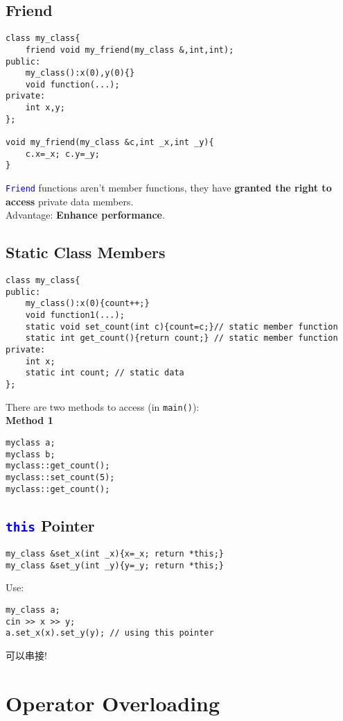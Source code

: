 \documentclass[12pt,a4paper]{article}
\begin{document}
			
		\subsection{Friend}
			\begin{lstlisting}
class my_class{
	friend void my_friend(my_class &,int,int);
public:
	my_class():x(0),y(0){}
	void function(...);
private:
	int x,y;
};

void my_friend(my_class &c,int _x,int _y){
	c.x=_x; c.y=_y;
}
\end{lstlisting}
			\texttt{\textcolor{blue}{Friend}} functions aren't member functions, they have \textbf{granted the right to access} private data members.\\
			Advantage: \textbf{Enhance performance}.
	
		\subsection{Static Class Members}
			\begin{lstlisting}
class my_class{
public:
	my_class():x(0){count++;}
	void function1(...);
	static void set_count(int c){count=c;}// static member function
	static int get_count(){return count;} // static member function
private:
	int x;
	static int count; // static data
};
\end{lstlisting}
			There are two methods to access (in \texttt{main()}):\\
			\textbf{Method 1}
			\begin{lstlisting}
myclass a;
myclass b;
myclass::get_count();
myclass::set_count(5);
myclass::get_count();
\end{lstlisting}
	
	
	
		\subsection{\texttt{\textcolor{blue}{this}} Pointer}
			
			\begin{lstlisting}
my_class &set_x(int _x){x=_x; return *this;}
my_class &set_y(int _y){y=_y; return *this;}
\end{lstlisting}
			Use:
			\begin{lstlisting}
my_class a;
cin >> x >> y;
a.set_x(x).set_y(y); // using this pointer
\end{lstlisting}
			可以串接!
		
	\section{Operator Overloading}
\end{document}
